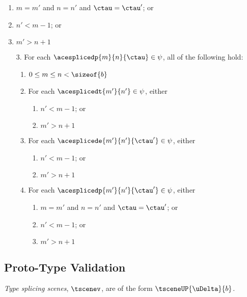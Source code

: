 \begin{definition}
\begin{enumerate}
\begin{enumerate}
        \begin{enumerate}
          \item $m=m'$ and $n=n'$ and $\ctau=\ctau'$; or 
          \item $n' < m - 1$; or 
          \item $m' > n + 1$
        \end{enumerate}
    \end{enumerate}
\end{enumerate}
\begin{grayparbox}
\begin{enumerate}
\item[3.] For each $\acesplicedp{m}{n}{\ctau} \in \psi$, all of the following hold:
    \begin{enumerate}
      \item $0 \leq m \leq n < \sizeof{b}$
      \item For each $\acesplicedt{m'}{n'} \in \psi$, either 
        \begin{enumerate}
          \item $n' < m - 1$; or 
          \item $m' > n + 1$
        \end{enumerate}
      \item For each $\acesplicede{m'}{n'}{\ctau'} \in \psi$, either 
        \begin{enumerate}
          \item $n' < m - 1$; or 
          \item $m' > n + 1$
        \end{enumerate}
      \item For each $\acesplicedp{m'}{n'}{\ctau'} \in \psi$, either 
        \begin{enumerate}
          \item $m=m'$ and $n=n'$ and $\ctau=\ctau'$; or 
          \item $n' < m - 1$; or 
          \item $m' > n + 1$
        \end{enumerate}
    \end{enumerate}
\end{enumerate}
\end{grayparbox}
\end{definition}

\subsection{Proto-Type Validation}\label{appendix:proto-type-validation-SES}
\emph{Type splicing scenes}, $\tscenev$, are of the form $\tsceneUP{\uDelta}{b}$.


